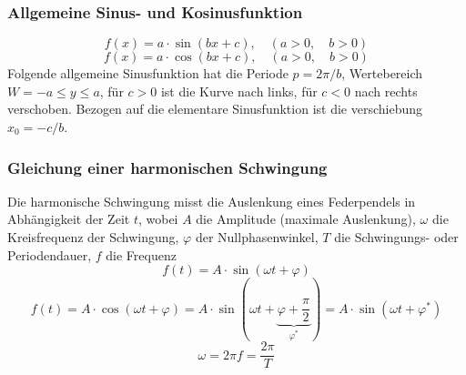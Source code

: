 \subsubsection{Allgemeine Sinus- und Kosinusfunktion}
\begin{equation}
\boxed{f\left(x\right)=a\cdot \sin\left(bx+c\right),\quad \left(a>0,\quad b>0\right)}
\end{equation}
\begin{equation}
\boxed{f\left(x\right)=a\cdot \cos\left(bx+c\right),\quad \left(a>0,\quad b>0\right)}
\end{equation}
Folgende allgemeine Sinusfunktion hat die Periode $p=2\pi/b$, Wertebereich $W=-a\leq y \leq a$, für $c>0$ ist die Kurve nach links, für $c<0$ nach rechts verschoben. Bezogen auf die elementare Sinusfunktion ist die verschiebung $x_0=-c/b$.
\subsubsection{Gleichung einer harmonischen Schwingung}
Die harmonische Schwingung misst die Auslenkung eines Federpendels in Abhängigkeit der Zeit $t$, wobei $A$ die Amplitude (maximale Auslenkung), $\omega$ die Kreisfrequenz der Schwingung, $\varphi$ der Nullphasenwinkel, $T$ die Schwingungs- oder Periodendauer, $f$ die Frequenz 
\begin{equation}
\boxed{f\left(t\right)=A\cdot \sin\left(\omega t+\varphi\right)}
\end{equation}
\begin{equation}
\boxed{f\left(t\right)=A\cdot \cos\left(\omega t+\varphi\right)=A\cdot \sin\left(\omega t+\underbrace{\varphi+\dfrac{\pi}{2}}_{\varphi^*}\right)=A\cdot \sin\left(\omega t+\varphi^*\right)}
\end{equation}
\begin{equation}
\boxed{\omega=2\pi f=\dfrac{2\pi}{T}} 
\end{equation}
